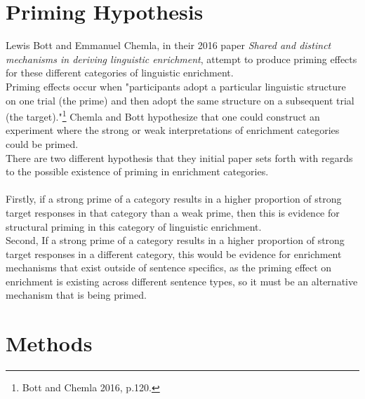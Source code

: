 \documentclass[]{article}
\begin{document}
\section*{Priming Hypothesis}
Lewis Bott and Emmanuel Chemla, in their 2016 paper \textit{Shared and distinct mechanisms in deriving linguistic enrichment}, attempt to produce priming effects for these different categories of linguistic enrichment. \\
Priming effects occur when "participants adopt a particular linguistic structure on one trial (the prime) and then adopt the same structure on a subsequent trial (the target)."\footnote{Bott and Chemla 2016, p.120.} Chemla and Bott hypothesize that one could construct an experiment where the strong or weak interpretations of enrichment categories could be primed.\\
There are two different hypothesis that they initial paper sets forth with regards to the possible existence of priming in enrichment categories.\\
\\Firstly, if a strong prime of a category results in a higher proportion of strong target responses in that category than a weak prime, then this is evidence for structural priming in this category of linguistic enrichment.
\\Second, If a strong prime of a category results in a higher proportion of strong target responses in a different category, this would be evidence for enrichment mechanisms that exist outside of sentence specifics, as the priming effect on enrichment is existing across different sentence types, so it must be an alternative mechanism that is being primed.\\


\section*{Methods}
\end{document}

